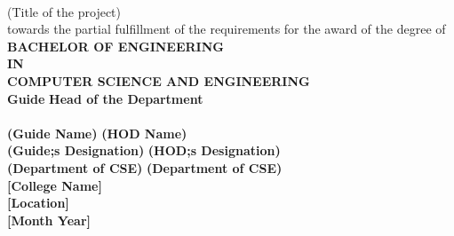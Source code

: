 \documentclass[12pt, a4paper]{report}
\begin{document}
\begin{titlepage}
\begin{center}
			\vspace{0.2in}
			\underline{\hspace{10cm}}\\
			\vspace{0.2in}
			(Title of the project)\\
			\vspace{0.2in}
			towards the partial fulfillment of the requirements for the award of the degree of\\
			\vspace{0.2in}
			\textbf{BACHELOR OF ENGINEERING\\IN\\COMPUTER SCIENCE AND ENGINEERING}\\
			\vspace{0.5in}
			\textbf{Guide} \hspace{3.5in} \textbf{Head of the Department}\\
			\vspace{0.3in}
			\underline{\hspace{6cm}} \hspace{1.5in} \underline{\hspace{6cm}}\\
			\vspace{0.1in}
			\textbf{(Guide Name)} \hspace{2.7in} \textbf{(HOD Name)}\\
			\vspace{0.1in}
			\textbf{(Guide;s Designation)} \hspace{2in} \textbf{(HOD;s Designation)}\\
			\vspace{0.1in}
			\textbf{(Department of CSE)} \hspace{2.1in} \textbf{(Department of CSE)}\\
			\vspace{0.1in}
			\textbf{[College Name]}\\
			\vspace{0.1in}
			\textbf{[Location]}\\
			\vspace{0.1in}
			\textbf{[Month Year]}
		\end{center}
	\end{titlepage}
	
\end{document}
